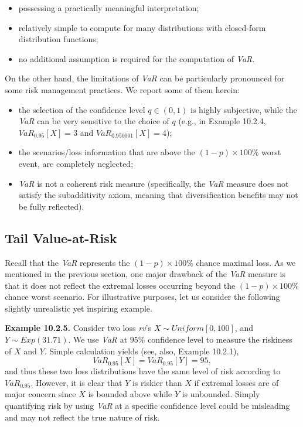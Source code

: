 \documentclass[]{book}
\providecommand{\tightlist}{%
  \setlength{\itemsep}{0pt}\setlength{\parskip}{0pt}}
\theoremstyle{definition}
\theoremstyle{definition}
\theoremstyle{definition}
\theoremstyle{remark}
\begin{document}
\begin{itemize}
\tightlist
\item
  possessing a practically meaningful interpretation;
\item
  relatively simple to compute for many distributions with closed-form
  distribution functions;
\item
  no additional assumption is required for the computation of
  \emph{VaR}.
\end{itemize}

On the other hand, the limitations of \emph{VaR} can be particularly
pronounced for some risk management practices. We report some of them
herein:

\begin{itemize}
\tightlist
\item
  the selection of the confidence level \(q\in (0,1)\) is highly
  subjective, while the \emph{VaR} can be very sensitive to the choice
  of \(q\) (e.g., in Example 10.2.4, \(VaR_{0.95}[X]=3\) and
  \(VaR_{0.950001}[X]=4\));
\item
  the scenarios/loss information that are above the
  \((1-p)\times 100\%\) worst event, are completely neglected;
\item
  \emph{VaR} is not a coherent risk measure (specifically, the
  \emph{VaR} measure does not satisfy the subadditivity axiom, meaning
  that diversification benefits may not be fully reflected).
\end{itemize}

\subsection{Tail Value-at-Risk}\label{tail-value-at-risk}

Recall that the \emph{VaR} represents the \((1-p)\times100\%\) chance
maximal loss. As we mentioned in the previous section, one major
drawback of the \emph{VaR} measure is that it does not reflect the
extremal losses occurring beyond the \((1-p)\times100\%\) chance worst
scenario. For illustrative purposes, let us consider the following
slightly unrealistic yet inspiring example.

\textbf{Example 10.2.5.} Consider two loss \emph{rv}'s
\(X\sim Uniform [0,100]\), and \(Y\sim Exp(31.71)\). We use \emph{VaR}
at \(95\%\) confidence level to measure the riskiness of \(X\) and
\(Y\). Simple calculation yields (see, also, Example 10.2.1), \[
VaR_{0.95}[X]=VaR_{0.95}[Y]=95,
\] and thus these two loss distributions have the same level of risk
according to \(VaR_{0.95}\). However, it is clear that \(Y\) is riskier
than \(X\) if extremal losses are of major concern since \(X\) is
bounded above while \(Y\) is unbounded. Simply quantifying risk by using
\emph{VaR} at a specific confidence level could be misleading and may
not reflect the true nature of risk.
\end{document}
